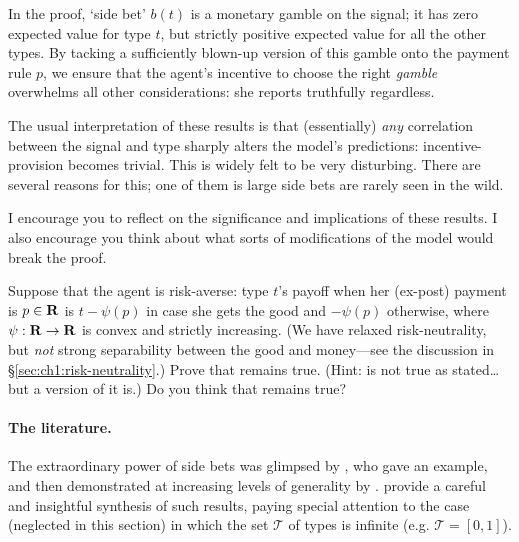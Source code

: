 In the proof, `side bet' $b(t)$ is a monetary gamble on the signal; it has zero expected value for type $t$, but strictly positive expected value for all the other types.
By tacking a sufficiently blown-up version of this gamble onto the payment rule $p$,
we ensure that the agent's incentive to choose the right \emph{gamble} overwhelms all other considerations:
she reports truthfully regardless.

The usual interpretation of these results
is that (essentially) \emph{any} correlation between the signal and type sharply alters the model's predictions: incentive-provision becomes trivial.
This is widely felt to be very disturbing.
There are several reasons for this; one of them is large side bets are rarely seen in the wild.

I encourage you to reflect on the significance and implications of these results.
I also encourage you think about what sorts of modifications of the model would break the proof.


\begin{exercise}
	\label{exercise:CremerMclean_riskaversion}
	Suppose that the agent is risk-averse:
	type $t$'s payoff when her (ex-post) payment is $p \in \mathbf{R}$ is
	$t-\psi(p)$ in case she gets the good
	and $-\psi(p)$ otherwise,
	where $\psi : \mathbf{R} \to \mathbf{R}$ is convex and strictly increasing.
	(We have relaxed risk-neutrality, but \emph{not} strong separability between the good and money---see the discussion in §\ref{sec:ch1:risk-neutrality}.)
	Prove that  remains true.
	(Hint:  is not true as stated\dots but a version of it is.)
	Do you think that  remains true?
\end{exercise}

\paragraph{The literature.}
The extraordinary power of side bets was glimpsed by \textcite[§7]{Myerson1981}, who gave an example,
and then demonstrated at increasing levels of generality by \textcite{CremerMclean1985,CremerMclean1988,McafeeReny1992}.
\textcite{LopomoRigottiShannon2022} provide a careful and insightful synthesis of such results, paying special attention to the case (neglected in this section) in which the set $\mathcal{T}$ of types is infinite (e.g. $\mathcal{T}=[0,1]$).

